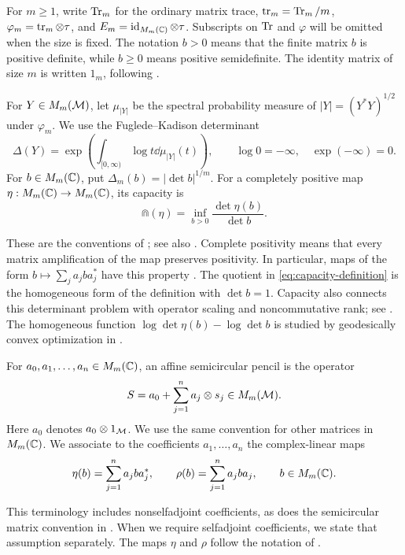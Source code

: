 For $m\ge1$, write $\operatorname{Tr}_m$ for the ordinary matrix trace, $\operatorname{tr}_m=\operatorname{Tr}_m/m$, $\varphi_m=\operatorname{tr}_m\otimes\tau$, and $E_m=\operatorname{id}_{M_m(\mathbb C)}\otimes\tau$.
Subscripts on $\operatorname{Tr}$ and $\varphi$ will be omitted when the size is fixed.
The notation $b>0$ means that the finite matrix $b$ is positive definite, while $b\ge0$ means positive semidefinite.
The identity matrix of size $m$ is written $1_m$, following \cite[Section 2.2]{MS24}.

\begin{definition}\label{def:determinant-capacity}
For $Y\in M_m(\mathcal M)$, let $\mu_{|Y|}$ be the spectral probability measure of $|Y|=(Y^*Y)^{1/2}$ under $\varphi_m$.
We use the Fuglede--Kadison determinant
\begin{equation}\label{eq:fk-definition}
 \Delta(Y)=\exp\left(\int_{[0,\infty)}\log t\dd\mu_{|Y|}(t)\right),
 \qquad \log0=-\infty,\quad \exp(-\infty)=0.
\end{equation}
For $b\in M_m(\mathbb C)$, put $\Delta_m(b)=|\det b|^{1/m}$.
For a completely positive map $\eta:M_m(\mathbb C)\to M_m(\mathbb C)$, its capacity is
\begin{equation}\label{eq:capacity-definition}
 \Cap(\eta)=\inf_{b>0}\frac{\det\eta(b)}{\det b}.
\end{equation}
\end{definition}
These are the conventions of \cite[Definitions 1.1 and 2.1]{MS24};
see also \cite{FK52,Gur04}.
Complete positivity means that every matrix amplification of the map preserves positivity.
In particular, maps of the form $b\mapsto\sum_j a_jba_j^*$ have this property \cite[Section 2.2]{MS24}.
The quotient in \eqref{eq:capacity-definition} is the homogeneous form of the definition with $\det b=1$.
Capacity also connects this determinant problem with operator scaling and noncommutative rank; see \cite[Sections 1.1--1.3]{GGOW20}.
The homogeneous function $\log\det\eta(b)-\log\det b$ is studied by geodesically convex optimization in \cite[Section 1.1]{AZGL+18}.

\begin{definition}\label{def:affine-pencil}
For $a_0,a_1,\ldots,a_n\in M_m(\mathbb C)$, an affine semicircular pencil is the operator
\begin{equation}\label{eq:affine-pencil}
 S=a_0+\sum_{j=1}^n a_j\otimes s_j\in M_m(\mathcal M).
\end{equation}
Here $a_0$ denotes $a_0\otimes1_{\mathcal M}$.
We use the same convention for other matrices in $M_m(\mathbb C)$.
We associate to the coefficients $a_1,\ldots,a_n$ the complex-linear maps
\begin{equation}\label{eq:coefficient-maps}
 \eta(b)=\sum_{j=1}^n a_jba_j^*,\qquad
 \rho(b)=\sum_{j=1}^n a_jba_j,
 \qquad b\in M_m(\mathbb C).
\end{equation}
\end{definition}
This terminology includes nonselfadjoint coefficients, as does the semicircular matrix convention in \cite[p.~3]{MS24}.
When we require selfadjoint coefficients, we state that assumption separately.
The maps $\eta$ and $\rho$ follow the notation of \cite[Theorem 1.2 and Lemma 3.5(ii)]{MS24}.

